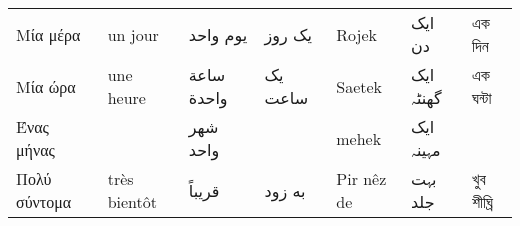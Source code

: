 \begin{longtable}{p{3.5cm} p{3.5cm} p{3.5cm} p{3.5cm} p{3.5cm} p{3.5cm} p{3.5cm} }
 Μία μέρα                                                                                                                      & un jour                                                                                         & يوم واحد                                                                              & یک روز                                                      & Rojek                                                                              & ایک دن                                                                         & এক দিন                                                            \\
 Μία ώρα                                                                                                                       & une heure                                                                                       & ساعة واحدة                                                                            & یک ساعت                                                     & Saetek                                                                             & ایک گھنٹہ                                                                      & এক ঘন্টা                                                          \\
 Ένας μήνας                                                                                                                    &                                                                                                 & شهر واحد                                                                              &                                                             & mehek                                                                              & ایک مہینہ                                                                      &                                                                   \\
 Πολύ σύντομα                                                                                                                  & très bientôt                                                                                    & قريباً                                                                                & به زود                                                      & Pir nêz de                                                                         & بہت جلد                                                                        & খুব শীঘ্রি                                                        \\

\end{longtable}
